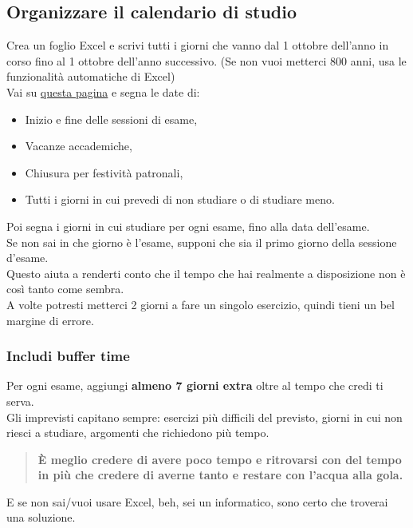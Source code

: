 \documentclass[18pt]{extarticle}
\begin{document}
\subsection{Organizzare il calendario di studio}
Crea un foglio Excel e scrivi tutti i giorni che vanno dal 1 ottobre dell'anno in corso fino al 1 ottobre dell'anno successivo. (Se non vuoi metterci 800 anni, usa le funzionalità automatiche di Excel)\\
Vai su \href{https://www.uniud.it/it/didattica/corsi/area-scientifica/scienze-matematiche-informatiche-multimediali-fisiche/laurea/informatica/studiare/orario-lezioni}{questa pagina} e segna le date di:
\begin{itemize}
\item Inizio e fine delle sessioni di esame,
\item Vacanze accademiche,
\item Chiusura per festività patronali,
\item Tutti i giorni in cui prevedi di non studiare o di studiare meno.
\end{itemize}
Poi segna i giorni in cui studiare per ogni esame, fino alla data dell'esame.\\
Se non sai in che giorno è l'esame, supponi che sia il primo giorno della sessione d'esame.\\
Questo aiuta a renderti conto che il tempo che hai realmente a disposizione non è così tanto come sembra.\\
A volte potresti metterci 2 giorni a fare un singolo esercizio, quindi tieni un bel margine di errore.


\subsubsection{Includi buffer time}
Per ogni esame, aggiungi \textbf{almeno 7 giorni extra} oltre al tempo che credi ti serva.\\
Gli imprevisti capitano sempre: esercizi più difficili del previsto, giorni in cui non riesci a studiare, argomenti che richiedono più tempo.
\begin{quote}
\textbf{È meglio credere di avere poco tempo e ritrovarsi con del tempo in più che credere di averne tanto e restare con l'acqua alla gola.}
\end{quote}%
E se non sai/vuoi usare Excel, beh, sei un informatico, sono certo che troverai una soluzione.
\end{document}
